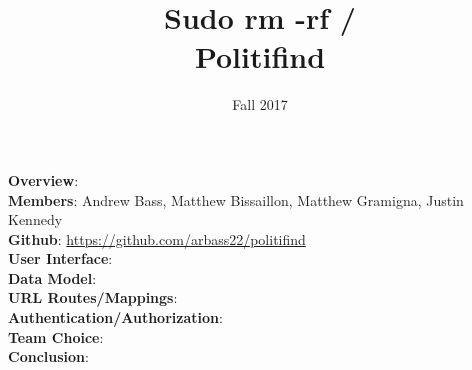 \documentclass{article}
\newcommand{\n}{\noindent}
\begin{document}
\title{Sudo rm -rf / \\ \large{Politifind}}
\author{Fall 2017}
\date{}
\maketitle

\n\textbf{Overview}:\\

\n\textbf{Members}: Andrew Bass, Matthew Bissaillon, Matthew Gramigna, Justin Kennedy \\

\n\textbf{Github}: \url{https://github.com/arbass22/politifind} \\

\n\textbf{User Interface}: \\

\n\textbf{Data Model}: \\

\n\textbf{URL Routes/Mappings}: \\

\n\textbf{Authentication/Authorization}: \\

\n\textbf{Team Choice}: \\

\n\textbf{Conclusion}: \\
\end{document}
